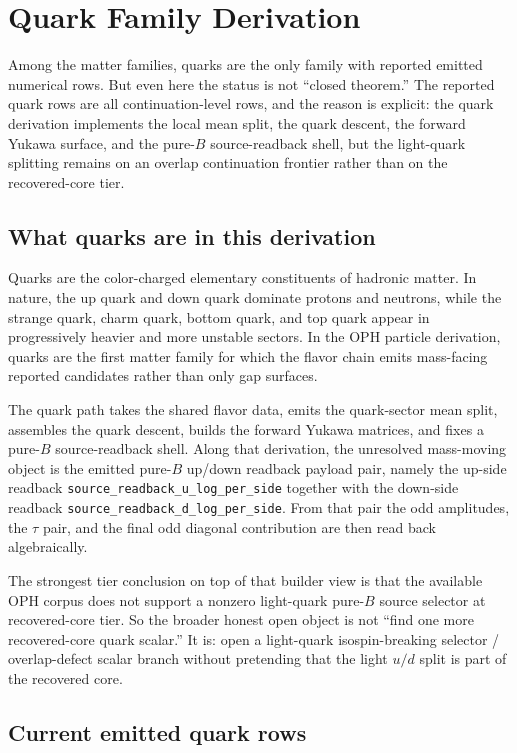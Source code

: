\documentclass[11pt]{article}
\begin{document}
\section{Quark Family Derivation}

Among the matter families, quarks are the only family with reported emitted numerical rows. But
even here the status is not ``closed theorem.'' The reported quark rows are all
continuation-level rows, and the reason is explicit: the quark derivation
implements the local mean split, the quark descent, the forward Yukawa surface, and the
pure-\(B\) source-readback shell, but the light-quark splitting remains on an overlap
continuation frontier rather than on the recovered-core tier.

\subsection{What quarks are in this derivation}

Quarks are the color-charged elementary constituents of hadronic matter. In nature, the up quark
and down quark dominate protons and neutrons, while the strange quark, charm quark, bottom
quark, and top quark appear in progressively heavier and more unstable sectors. In the OPH
particle derivation, quarks are the first matter family for which the flavor chain
emits mass-facing reported candidates rather than only gap surfaces.

The quark path takes the shared flavor data, emits the quark-sector mean split, assembles
the quark descent, builds the forward Yukawa matrices, and fixes a pure-\(B\) source-readback
shell. Along that derivation, the unresolved mass-moving object is the emitted
pure-\(B\) up/down readback payload pair, namely the up-side readback
\texttt{source\_readback\_u\_log\_per\_side} together with the down-side readback
\texttt{source\_readback\_d\_log\_per\_side}. From that pair the odd amplitudes, the \(\tau\)
pair, and the final odd diagonal contribution are then read back algebraically.

The strongest tier conclusion on top of that builder view is that the available OPH corpus does
not support a nonzero light-quark pure-\(B\) source selector at
recovered-core tier. So the broader honest open object is not ``find one more recovered-core
quark scalar.'' It is: open a light-quark isospin-breaking selector / overlap-defect scalar
branch without pretending that the light \(u/d\) split is part of the recovered core.

\subsection{Current emitted quark rows}
\end{document}
